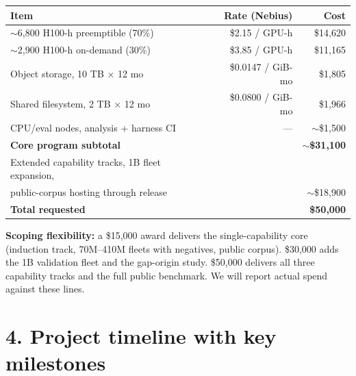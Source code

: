 \documentclass[11pt]{article}
\begin{document}
\begin{center}\small
\begin{tabular}{@{}lrr@{}}
\toprule
Item & Rate (Nebius) & Cost \\
\midrule
$\sim$6{,}800 H100-h preemptible (70\%) & \$2.15 / GPU-h & \$14{,}620 \\
$\sim$2{,}900 H100-h on-demand (30\%) & \$3.85 / GPU-h & \$11{,}165 \\
Object storage, 10 TB $\times$ 12 mo & \$0.0147 / GiB-mo & \$1{,}805 \\
Shared filesystem, 2 TB $\times$ 12 mo & \$0.0800 / GiB-mo & \$1{,}966 \\
CPU/eval nodes, analysis + harness CI & --- & $\sim$\$1{,}500 \\
\midrule
\textbf{Core program subtotal} & & \textbf{$\sim$\$31{,}100} \\
Extended capability tracks, 1B fleet expansion, & & \\
public-corpus hosting through release & & $\sim$\$18{,}900 \\
\midrule
\textbf{Total requested} & & \textbf{\$50{,}000} \\
\bottomrule
\end{tabular}
\end{center}

\textbf{Scoping flexibility:} a \$15{,}000 award delivers the single-capability core
(induction track, 70M--410M fleets with negatives, public corpus). \$30{,}000 adds the 1B
validation fleet and the gap-origin study. \$50{,}000 delivers all three capability tracks
and the full public benchmark. We will report actual spend against these lines.

\section*{4. Project timeline with key milestones}
\end{document}

